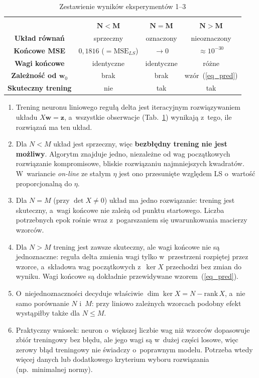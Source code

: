 \documentclass[12pt]{article}
\begin{document}
\begin{table}[h!]
 \caption{Zestawienie wyników eksperymentów 1--3}
 \centering
 \vspace{0.2cm}
 \begin{tabular}{c c c c}
  \hline\hline\\[-0.4cm]
   & $\boldsymbol{N<M}$ & $\boldsymbol{N=M}$ & $\boldsymbol{N>M}$\\[0.1cm]
  \hline
  \textbf{Układ równań} & sprzeczny & oznaczony & nieoznaczony \\
  \textbf{Końcowe MSE} & $0{,}1816$ ($=\mathrm{MSE}_{LS}$) & $\to 0$ & $\approx 10^{-30}$ \\
  \textbf{Wagi końcowe} & identyczne & identyczne & różne \\
  \textbf{Zależność od $\mathbf{w}_0$} & brak & brak & wzór~(\ref{eq_pred}) \\
  \textbf{Skuteczny trening} & nie & tak & tak \\[0.1cm]
  \hline
 \end{tabular}
 \label{tab_zestawienie}
\end{table}

\begin{enumerate}
 \item Trening neuronu liniowego regułą delta jest iteracyjnym rozwiązywaniem
       układu $X\mathbf{w}=\mathbf{z}$, a~wszystkie obserwacje (Tab.~\ref{tab_zestawienie})
       wynikają z~tego, ile rozwiązań ma ten układ.
 \item Dla $N<M$ układ jest sprzeczny, więc \textbf{bezbłędny trening nie jest możliwy}.
       Algorytm znajduje jedno, niezależne od wag początkowych rozwiązanie
       kompromisowe, bliskie rozwiązaniu najmniejszych kwadratów. W~wariancie
       \textit{on-line} ze stałym $\eta$ jest ono przesunięte względem LS
       o~wartość proporcjonalną do $\eta$.
 \item Dla $N=M$ (przy $\det X\neq0$) układ ma jedno rozwiązanie: trening jest skuteczny,
       a~wagi końcowe nie zależą od punktu startowego. Liczba potrzebnych epok rośnie
       wraz z~pogarszaniem się uwarunkowania macierzy wzorców.
 \item Dla $N>M$ trening jest zawsze skuteczny, ale wagi końcowe nie są jednoznaczne:
       reguła delta zmienia wagi tylko w~przestrzeni rozpiętej przez wzorce, a~składowa
       wag początkowych z~$\ker X$ przechodzi bez zmian do wyniku. Wagi końcowe
       są dokładnie przewidywane wzorem~(\ref{eq_pred}).
 \item O~niejednoznaczności decyduje właściwie $\dim\ker X = N - \mathrm{rank}\,X$,
       a~nie samo porównanie $N$ i~$M$: przy liniowo zależnych wzorcach podobny efekt
       wystąpiłby także dla $N\le M$.
 \item Praktyczny wniosek: neuron o~większej liczbie wag niż wzorców dopasowuje
       zbiór treningowy bez błędu, ale jego wagi są w~dużej części losowe, więc
       zerowy błąd treningowy nie świadczy o~poprawnym modelu. Potrzeba wtedy więcej
       danych lub dodatkowego kryterium wyboru rozwiązania (np.~minimalnej normy).
\end{enumerate}
\end{document}

